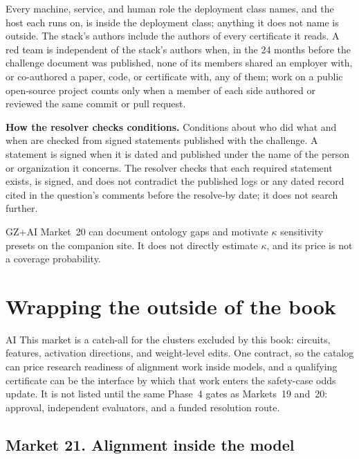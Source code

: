 \begin{predictionfineprint}
Every machine, service, and human role the deployment class names, and the host each runs on, is inside the deployment class; anything it does not name is outside.
The stack's authors include the authors of every certificate it reads.
A red team is independent of the stack's authors when, in the 24 months before the challenge document was published, none of its members shared an employer with, or co-authored a paper, code, or certificate with, any of them; work on a public open-source project counts only when a member of each side authored or reviewed the same commit or pull request.

\textbf{How the resolver checks conditions.}
Conditions about who did what and when are checked from signed statements published with the challenge.
A statement is signed when it is dated and published under the name of the person or organization it concerns.
The resolver checks that each required statement exists, is signed, and does not contradict the published logs or any dated record cited in the question's comments before the resolve-by date; it does not search further.
\end{predictionfineprint}

\begin{authbar}{GZ+AI}
Market~20 can document ontology gaps and motivate $\kappa$ sensitivity presets on the companion site.
It does not directly estimate $\kappa$, and its price is not a coverage probability.

\end{authbar}
\authbarneedspace
\section{Wrapping the outside of the book}
\label{sec:appp-internals-wrapper}
\begin{authbar}{AI}
This market is a catch-all for the clusters excluded by this book: circuits, features, activation directions, and weight-level edits.
One contract, so the catalog can price research readiness of alignment work inside models, and a qualifying certificate can be the interface by which that work enters the safety-case odds update.
It is not listed until the same Phase~4 gates as Markets~19 and~20: approval, independent evaluators, and a funded resolution route.

\end{authbar}
\authbarneedspace
\subsection{Market 21. Alignment inside the model}
\label{sec:appp-m21}

